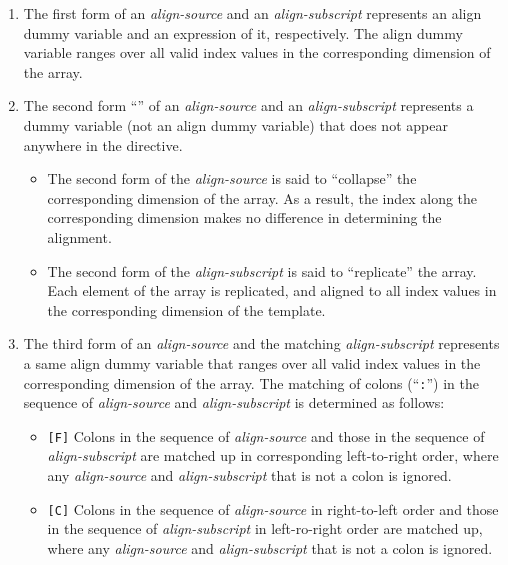 \begin{enumerate}
\item The first form of an {\it align-source} and an {\it
      align-subscript} represents an align dummy variable and an
      expression of it, respectively. The align dummy variable ranges
      over all valid index values in the corresponding dimension of the
      array.
\item The second form ``{\tt *}'' of an {\it align-source} and an {\it
      align-subscript} represents a dummy variable (not an align dummy
      variable) that does not appear anywhere in the directive.
      \begin{itemize} 
       \item The second form of the {\it align-source} is said to
	     ``collapse'' the corresponding dimension of the array. As a
	     result, the index along the corresponding dimension makes
	     no difference in determining the alignment.
       \item The second form of the {\it align-subscript} is said to
	     ``replicate'' the array. Each element of the array is
	     replicated, and aligned to all index values in the
	     corresponding dimension of the template.
      \end{itemize}
\item The third form of an {\it align-source} and the matching {\it
      align-subscript} represents a same align dummy variable that
      ranges over all valid index values in the corresponding dimension
      of the array. The matching of colons (``{\tt :}'') in the sequence
      of {\it align-source} and {\it align-subscript} is determined as
      follows:

      \begin{itemize}
       \item \verb![F]! Colons in the sequence of {\it align-source} and
	     those in the sequence of {\it align-subscript} are matched
	     up in corresponding left-to-right order, where any {\it
	     align-source} and {\it align-subscript} that is not a colon
	     is ignored.
       \item \verb![C]! Colons in the sequence of {\it align-source} in
	     right-to-left order and those in the sequence of {\it 
	     align-subscript} in left-ro-right order are matched up,
	     where any {\it align-source} and {\it align-subscript} that
	     is not a colon is ignored.
      \end{itemize}


\end{enumerate}

